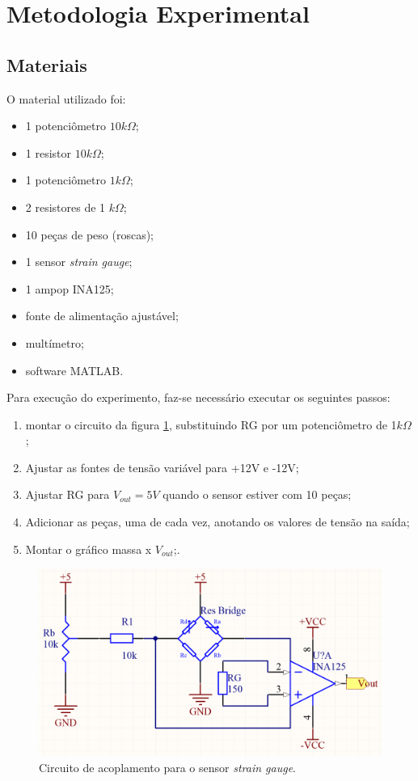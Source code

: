 \newpage
\section{Metodologia Experimental}

\subsection{Materiais}
O material utilizado foi:
\begin{itemize}
\item 1 potenciômetro $10k \Omega$;
\item 1 resistor $10k \Omega$;
\item 1 potenciômetro $1k \Omega$;
\item 2 resistores de 1 $k\Omega$;
\item 10 peças de peso (roscas);
\item 1 sensor \textit{strain gauge};
\item 1 ampop INA125;
\item fonte de alimentação ajustável;
\item multímetro;
\item software MATLAB.
\end{itemize}

Para execução do experimento, faz-se necessário executar os seguintes passos:

\begin{enumerate}
\item montar o circuito da figura \ref{f_sch}, substituindo RG por um potenciômetro de 1$k\Omega$;
\item Ajustar as fontes de tensão variável para +12V e -12V;
\item Ajustar RG para $V_{out} = 5V$ quando o sensor estiver com 10 peças;
\item Adicionar as peças, uma de cada vez, anotando os valores de tensão na saída;
\item Montar o gráfico massa x $V_{out}$;.
\end{enumerate}

\begin{figure}[H]
    \centering
    \includegraphics[scale=0.5]{img/sch.png}
    \caption{Circuito de acoplamento para o sensor \textit{strain gauge}.}
    \label{f_sch}
\end{figure}